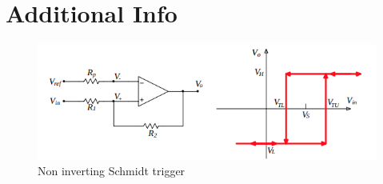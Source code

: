 \chapter{Additional Info}
\begin{figure}[!htb]
\centering
\includegraphics[scale=0.7]{./Figures/schmidt}
\caption{Non inverting Schmidt trigger\cite{Schmidt}}
\label{fig:schmidt}
\end{figure}

